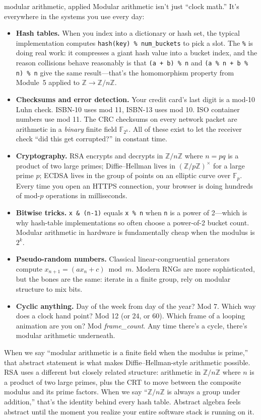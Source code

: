 \documentclass[11pt]{article}
\begin{document}
\begin{sidebar}{modular arithmetic, applied}
Modular arithmetic isn't just ``clock math.'' It's everywhere in the systems you use every day:

\begin{itemize}
  \item \textbf{Hash tables.} When you index into a dictionary or hash set, the typical implementation computes \texttt{hash(key) \% num\_buckets} to pick a slot. The \texttt{\%} is doing real work: it compresses a giant hash value into a bucket index, and the reason collisions behave reasonably is that \texttt{(a + b) \% n} and \texttt{(a \% n + b \% n) \% n} give the same result---that's the homomorphism property from Module~5 applied to $\mathbb{Z} \to \mathbb{Z}/n\mathbb{Z}$.
  \item \textbf{Checksums and error detection.} Your credit card's last digit is a mod-10 Luhn check. ISBN-10 uses mod 11, ISBN-13 uses mod 10. ISO container numbers use mod 11. The CRC checksums on every network packet are arithmetic in a \emph{binary} finite field $\mathbb{F}_{2^k}$. All of these exist to let the receiver check ``did this get corrupted?'' in constant time.
  \item \textbf{Cryptography.} RSA encrypts and decrypts in $\mathbb{Z}/n\mathbb{Z}$ where $n = pq$ is a product of two large primes; Diffie--Hellman lives in $(\mathbb{Z}/p\mathbb{Z})^\times$ for a large prime $p$; ECDSA lives in the group of points on an elliptic curve over $\mathbb{F}_p$. Every time you open an HTTPS connection, your browser is doing hundreds of mod-$p$ operations in milliseconds.
  \item \textbf{Bitwise tricks.} \texttt{x \& (n-1)} equals \texttt{x \% n} when \texttt{n} is a power of 2---which is why hash-table implementations so often choose a power-of-2 bucket count. Modular arithmetic in hardware is fundamentally cheap when the modulus is $2^k$.
  \item \textbf{Pseudo-random numbers.} Classical linear-congruential generators compute $x_{n+1} = (a x_n + c) \bmod m$. Modern RNGs are more sophisticated, but the bones are the same: iterate in a finite group, rely on modular structure to mix bits.
  \item \textbf{Cyclic anything.} Day of the week from day of the year? Mod 7. Which way does a clock hand point? Mod 12 (or 24, or 60). Which frame of a looping animation are you on? Mod \textit{frame\_count}. Any time there's a cycle, there's modular arithmetic underneath.
\end{itemize}

When we say ``modular arithmetic is a finite field when the modulus is prime,'' that abstract statement is what makes Diffie--Hellman-style arithmetic possible. RSA uses a different but closely related structure: arithmetic in $\mathbb{Z}/n\mathbb{Z}$ where $n$ is a product of two large primes, plus the CRT to move between the composite modulus and its prime factors. When we say ``$\mathbb{Z}/n\mathbb{Z}$ is always a group under addition,'' that's the identity behind every hash table. Abstract algebra feels abstract until the moment you realize your entire software stack is running on it.
\end{sidebar}
\end{document}
